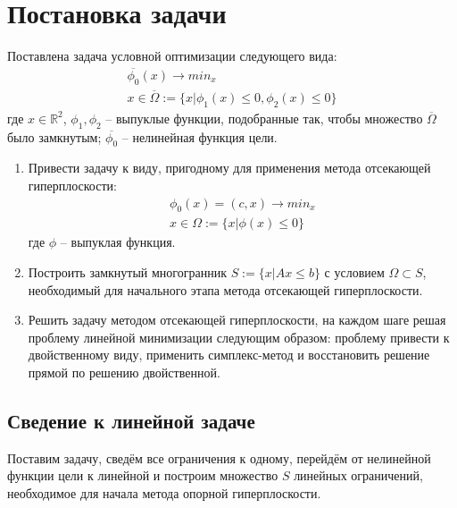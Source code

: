 \documentclass[main.tex]{subfiles}
\begin{document}
	
\section{Постановка задачи}
Поставлена задача условной оптимизации следующего вида:
\begin{gather*}
\overline{\phi_0}(x) \rightarrow min_{x} \\
x \in \overline{\varOmega} := \{x|\phi_1(x) \le 0, \phi_2(x) \le 0\} 
\end{gather*}
где $x \in \mathds{R}^2$, $\phi_1, \phi_2$ -- выпуклые функции, подобранные так, чтобы множество $\overline{\varOmega}$ было замкнутым; $\overline{\phi_0}$ -- нелинейная функция цели.\\
\begin{enumerate}
	\item Привести задачу к виду, пригодному для применения метода отсекающей гиперплоскости:
	\begin{gather*}
	\phi_0(x) = (c, x) \rightarrow min_{x} \\
	x \in \varOmega := \{x|\phi(x) \le 0\} 
	\end{gather*}
	где $\phi$ -- выпуклая функция.
	\item Построить замкнутый многогранник $S:=\{x|Ax\le b\}$ с условием $\varOmega \subset S$, необходимый для начального этапа метода отсекающей гиперплоскости.
	\item Решить задачу методом отсекающей гиперплоскости, на каждом шаге решая проблему линейной минимизации следующим образом: проблему привести к двойственному виду, применить симплекс-метод и восстановить решение прямой по решению двойственной.
\end{enumerate}
\subsection{Сведение к линейной задаче}
Поставим задачу, сведём все ограничения к одному, перейдём от нелинейной функции цели к линейной и построим множество $S$ линейных ограничений, необходимое для начала метода опорной гиперплоскости.

\end{document}
